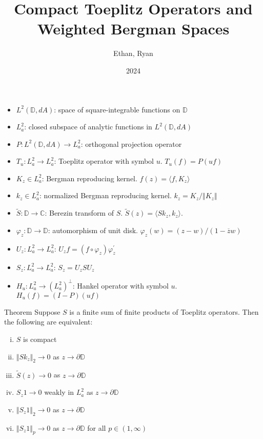 \documentclass{beamer}
\title{Compact Toeplitz Operators and Weighted Bergman Spaces}
\author{Ethan, Ryan}
\institute{Polymath Jr}
\date{2024}
\begin{document}
\frame{\titlepage}

\begin{frame}

\begin{itemize}
\item $L^2(\mathbb{D}, dA)$: space of square-integrable functions on $\mathbb{D}$
\item $L_a^2$: closed subspace of analytic functions in $L^2(\mathbb{D}, dA)$
\item $P: L^2(\mathbb{D},dA) \rightarrow L_a^2$: orthogonal projection operator
\item $T_u: L_a^2 \rightarrow L_a^2$: Toeplitz operator with symbol $u$. $T_u(f) = P(u f)$
\item $K_z \in L_a^2$: Bergman reproducing kernel. $f(z) = \langle f, K_z \rangle$ 
\item $k_z \in L_a^2$: normalized Bergman reproducing kernel. $k_z = K_z/\Vert K_z \Vert$
\item $\tilde{S}: \mathbb{D} \rightarrow \mathbb{C}$: Berezin transform of $S$. $\tilde{S}(z) = \langle Sk_z, k_z \rangle$.
\item $\varphi_z: \mathbb{D} \rightarrow \mathbb{D}$: automorphism of unit disk. $\varphi_z(w) = (z - w)/(1-\overline{z}w)$
\item $U_z: L_a^2 \rightarrow L_a^2$: $U_z f = (f\circ \varphi_z)\varphi_z^\prime$
\item $S_z: L_a^2 \rightarrow L_a^2$: $S_z = U_zSU_z$
\item $H_u: L_a^2 \rightarrow (L_a^2)^\perp$: Hankel operator with symbol $u$. $H_u(f) = (I-P)(uf)$
\end{itemize}
\end{frame}

\begin{frame}
\begin{block}{Theorem}
Suppose $S$ is a finite sum of finite products of Toeplitz operators. Then the following are equivalent:
\begin{enumerate}[(i)]
            \item $S$ is compact
            \item $\Vert Sk_z \Vert_2 \rightarrow 0$ as $z \rightarrow \partial{\mathbb{D}}$
            \item $\tilde{S}(z) \rightarrow 0$ as $z \rightarrow \partial{\mathbb{D}}$
            \item $S_z 1 \rightarrow 0$ weakly in $L_a^2$ as $z \rightarrow \partial{\mathbb{D}}$
            \item $\Vert S_z 1 \Vert_2 \rightarrow 0$ as $z \rightarrow \partial{\mathbb{D}}$
            \item $\Vert S_z 1\Vert_p \rightarrow 0$ as $z \rightarrow \partial{\mathbb{D}}$ for all $p \in (1,\infty)$
        \end{enumerate}
\end{block}
\end{frame}
\end{document}
